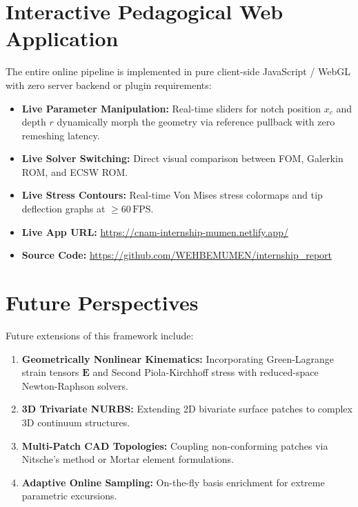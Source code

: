 \documentclass[11pt,a4paper]{article}
\begin{document}
\section{Interactive Pedagogical Web Application}
The entire online pipeline is implemented in pure client-side JavaScript / WebGL with zero server backend or plugin requirements:
\begin{itemize}[noitemsep, leftmargin=*]
    \item \textbf{Live Parameter Manipulation:} Real-time sliders for notch position $x_c$ and depth $r$ dynamically morph the geometry via reference pullback with zero remeshing latency.
    \item \textbf{Live Solver Switching:} Direct visual comparison between FOM, Galerkin ROM, and ECSW ROM.
    \item \textbf{Live Stress Contours:} Real-time Von Mises stress colormaps and tip deflection graphs at $\ge 60\,\text{FPS}$.
    \item \textbf{Live App URL:} \url{https://cnam-internship-mumen.netlify.app/}
    \item \textbf{Source Code:} \url{https://github.com/WEHBEMUMEN/internship_report}
\end{itemize}

\section{Future Perspectives}
Future extensions of this framework include:
\begin{enumerate}[noitemsep, leftmargin=*]
    \item \textbf{Geometrically Nonlinear Kinematics:} Incorporating Green-Lagrange strain tensors $\mathbf{E}$ and Second Piola-Kirchhoff stress with reduced-space Newton-Raphson solvers.
    \item \textbf{3D Trivariate NURBS:} Extending 2D bivariate surface patches to complex 3D continuum structures.
    \item \textbf{Multi-Patch CAD Topologies:} Coupling non-conforming patches via Nitsche's method or Mortar element formulations.
    \item \textbf{Adaptive Online Sampling:} On-the-fly basis enrichment for extreme parametric excursions.
\end{enumerate}
\end{document}
